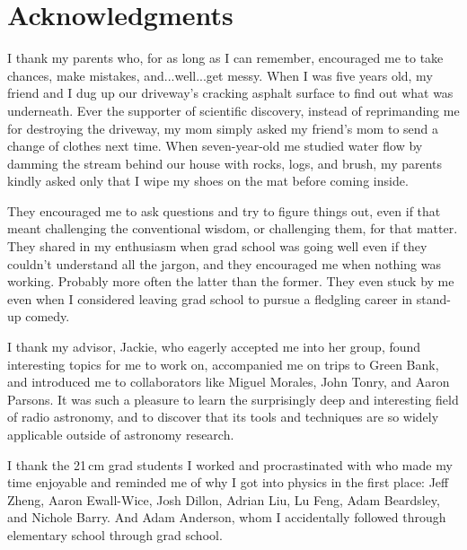 % 

\cleardoublepage

\section*{Acknowledgments}

I thank my parents who, for as long as I can remember, encouraged me to take chances, make mistakes, and...well...get messy. When I was five years old, my friend and I dug up our driveway's cracking asphalt surface to find out what was underneath. Ever the supporter of scientific discovery, instead of reprimanding me for destroying the driveway, my mom simply asked my friend's mom to send a change of clothes next time. When seven-year-old me studied water flow by damming the stream behind our house with rocks, logs, and brush, my parents kindly asked only that I wipe my shoes on the mat before coming inside. 

They encouraged me to ask questions and try to figure things out, even if that meant challenging the conventional wisdom, or challenging them, for that matter. They shared in my enthusiasm when grad school was going well even if they couldn't understand all the jargon, and they encouraged me when nothing was working. Probably more often the latter than the former. They even stuck by me even when I considered leaving grad school to pursue a fledgling career in stand-up comedy.

I thank my advisor, Jackie, who eagerly accepted me into her group, found interesting topics for me to work on, accompanied me on trips to Green Bank, and introduced me to collaborators like Miguel Morales, John Tonry, and Aaron Parsons. It was such a pleasure to learn the surprisingly deep and interesting field of radio astronomy, and to discover that its tools and techniques are so widely applicable outside of astronomy research.

I thank the 21\,cm grad students I worked and procrastinated with who made my time enjoyable and reminded me of why I got into physics in the first place: Jeff Zheng, Aaron Ewall-Wice, Josh Dillon, Adrian Liu, Lu Feng, Adam Beardsley, and Nichole Barry. And Adam Anderson, whom I accidentally followed through elementary school through grad school. 

